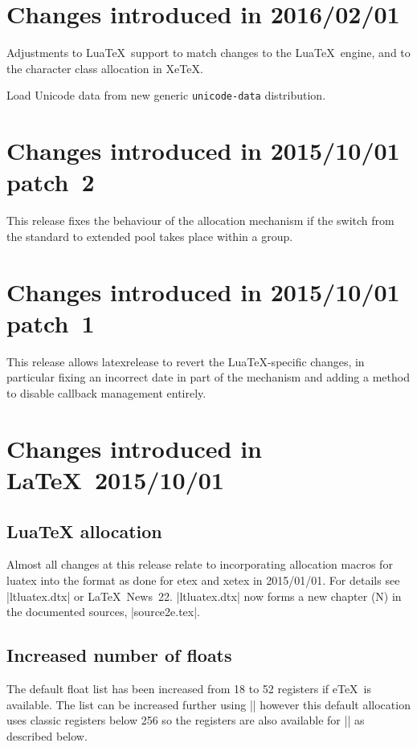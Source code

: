 \documentclass{ltxguide}
\newcommand\Lpack[1]{\mbox{\textsf{#1}}}
\newcommand\ltnewsissue[1]{\LaTeX\ News~#1}
\newcommand\ltnewsissue[1]{%
    \href{https://www.latex-project.org/news/latex2e-news/ltnews#1.pdf}{\LaTeX\ News~#1}}
\begin{document}
\section{Changes  introduced in 2016/02/01}
Adjustments to Lua\TeX\ support to match changes to the Lua\TeX\ engine,
and to the character class allocation in Xe\TeX.

Load Unicode data from new generic \texttt{unicode-data} distribution.

\section{Changes  introduced in 2015/10/01 patch~2}

This release fixes the behaviour of the allocation mechanism if the switch
from the standard to extended pool takes place within a group.

\section{Changes  introduced in 2015/10/01 patch~1}
This release allows \Lpack{latexrelease} to revert the 
Lua\TeX{}-specific
changes, in particular fixing an incorrect date in part of the mechanism and
adding a method to disable callback management entirely.

\section{Changes  introduced in \LaTeX\ 2015/10/01}

\subsection{LuaTeX allocation}
Almost all changes at this release relate to incorporating allocation macros for luatex into the format
as done for etex and xetex in 2015/01/01. For details see |ltluatex.dtx| or \ltnewsissue{22}.
|ltluatex.dtx| now forms a new chapter (N) in the documented sources, |source2e.tex|.


\subsection{Increased number of floats}
The default float list has been increased from 18 to 52 registers if
e\TeX\ is available.
The list can be increased further using |\extrafloats| however this
default allocation uses classic registers below 256 so the registers are
also available for |\newinsert| as described below.
\end{document}
